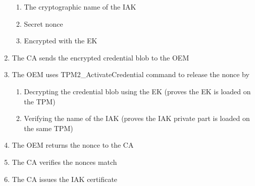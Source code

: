 \documentclass{article}
\begin{document}
\begin{enumerate}
    \begin{enumerate}
        \item The cryptographic name of the IAK
        \item Secret nonce
        \item Encrypted with the EK
    \end{enumerate}
    \item The CA sends the encrypted credential blob to the OEM
    \item The OEM uses TPM2\_ActivateCredential command to release the nonce by
    \begin{enumerate}
        \item Decrypting the credential blob using the EK (proves the EK is loaded on the TPM)
        \item Verifying the name of the IAK (proves the IAK private part is loaded on the same TPM)
    \end{enumerate}
    \item The OEM returns the nonce to the CA
    \item The CA verifies the nonces match
    \item The CA issues the IAK certificate
\end{enumerate}
\bigskip
\end{document}
